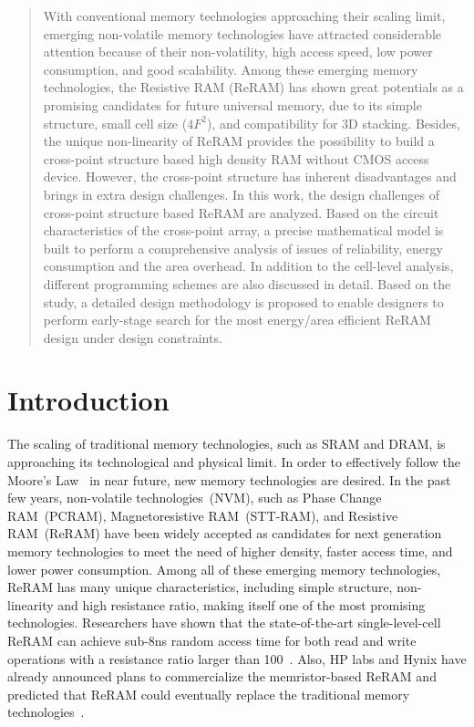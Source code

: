 \begin{abstract}
With conventional memory technologies approaching their scaling limit, emerging non-volatile memory technologies have attracted considerable attention because of their non-volatility, high access speed, low power consumption, and good scalability. Among these emerging memory technologies, the Resistive RAM (ReRAM) has shown great potentials as a promising candidates for future universal memory, due to its simple structure, small cell size ($4F^2$), and compatibility for 3D stacking. Besides, the unique non-linearity of ReRAM provides the possibility to build a cross-point structure based high density RAM without CMOS access device. However, the cross-point structure has inherent disadvantages and brings in extra design challenges. In this work, the design challenges of cross-point structure based ReRAM are analyzed. Based on the circuit characteristics of the cross-point array, a precise mathematical model is built to perform a comprehensive analysis of issues of reliability, energy consumption and the area overhead. In addition to the cell-level analysis, different programming schemes are also discussed in detail. Based on the study, a detailed design methodology is proposed to enable designers to perform early-stage search for the most energy/area efficient ReRAM design under design constraints.
\end{abstract}

\section{Introduction}\label{sec:intro}
The scaling of traditional memory technologies, such as SRAM and DRAM, is approaching its technological and physical limit. In order to effectively follow the Moore's Law~\cite{moore} in near future, new memory technologies are desired. In the past few years, non-volatile technologies~(NVM), such as Phase Change RAM~(PCRAM), Magnetoresistive RAM~(STT-RAM), and Resistive RAM~(ReRAM) have been widely accepted as candidates for next generation memory technologies to meet the need of higher density, faster access time, and lower power consumption. Among all of these emerging memory technologies, ReRAM has many unique characteristics, including simple structure, non-linearity and high resistance ratio, making itself one of the most promising technologies. Researchers have shown that the state-of-the-art single-level-cell ReRAM can achieve sub-8ns random access time for both read and write operations with a resistance ratio larger than 100~\cite{ReRAM_ISSCC2011_Sheu}. Also, HP labs and Hynix have already announced plans to commercialize the memristor-based ReRAM and predicted that ReRAM could eventually replace the traditional memory technologies~\cite{memristor:HpHynix}.

